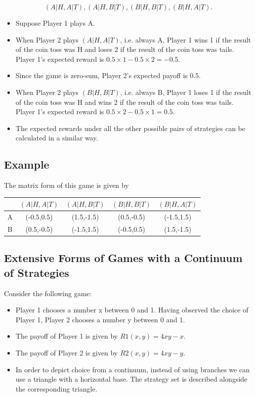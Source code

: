 \documentclass[]{report}
\begin{document}
\[(A|H, A|T), (A|H, B|T), (B|H, B|T), (B|H, A|T).\]

\begin{itemize}
	\item Suppose Player 1 plays A.
	\item	When Player 2 plays $(A|H, A|T)$, i.e. always A, Player 1 wins 1 if
	the result of the coin toss was H and loses 2 if the result of the
	coin toss was tails. Player 1’s expected reward is
	$0.5 × 1 − 0.5 × 2 = −0.5$. 
	\item Since the game is zero-sum, Player 2’s
	expected payoff is 0.5.
	\item	When Player 2 plays $(B|H, B|T)$, i.e. always B, Player 1 loses 1 if
	the result of the coin toss was H and wins 2 if the result of the
	coin toss was tails. Player 1’s expected reward is
	$0.5 × 2 − 0.5 × 1 = 0.5$.
	\item	The expected rewards under all the other possible pairs of
	strategies can be calculated in a similar way.
\end{itemize}


\subsection{Example}
The matrix form of this game is given by
\begin{center}
\begin{tabular}{ccccc}
  & $(A|H, A|T)$ & $(A|H, B|T)$ & $(B|H, B|T)$ &  $(B|H, A|T)$ \\ \hline
A & (-0.5,0.5) & (1.5,-1.5) & (0.5,-0.5) & (-1.5,1.5) \\ \hline
B & (0.5,-0.5) & (-1.5,1.5) & (-0.5,0.5) & (1.5,-1.5) \\ \hline
\end{tabular}
\end{center}
\subsection{Extensive Forms of Games with a Continuum of Strategies}
Consider the following game:
\begin{itemize}
	\item Player 1 chooses a number x between 0 and 1. Having observed
	the choice of Player 1, Player 2 chooses a number y between 0 and
	1.
	\item The payoff of Player 1 is given by $R1(x, y) = 4xy - x$. 
	\item The payoff
	of Player 2 is given by $R2(x, y) = 4xy - y$.
	\item In order to depict choice from a continuum, instead of using
	branches we can use a triangle with a horizontal base. The
	strategy set is described alongside the corresponding triangle.
\end{itemize}
\end{document}
